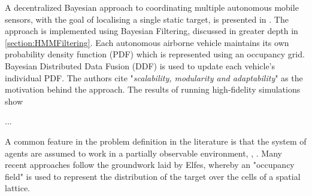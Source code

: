 A decentralized Bayesian approach to coordinating multiple autonomous mobile sensors, with the goal of localising a single static target, is presented in \cite{Bourgault2005DecentralizedSearch}. The approach is implemented using Bayesian Filtering, discussed in greater depth in \ref{section:HMMFiltering}. Each autonomous airborne vehicle maintains its own probability density function (PDF) which is represented using an occupancy grid. Bayesian Distributed Data Fusion (DDF) is used to update each vehicle's individual PDF. The authors cite "\textit{scalability, modularity and adaptability}" as the motivation behind the approach. The results of running high-fidelity simulations show

\cite{Chung2007ASearch} ...

\cite{Chung2012AnalysisStrategies}

\cite{Waharte2009CoordinatedUAVs}
\cite{Waharte2010ProbabilisticUAVs}
\cite{Waharte2010SupportingUAVsb}

A common feature in the problem definition in the literature is that the system of agents are assumed to work in a partially observable environment\cite{Symington2010ProbabilisticRAVs}, \cite{Chung2008Multi-agentFramework}, \cite{WongMulti-vehicleTargets}. Many recent approaches follow the groundwork laid by Elfes\cite{ElfesUsingNavigation}, whereby an "occupancy field" is used to represent the distribution of the target over the cells of a spatial lattice.